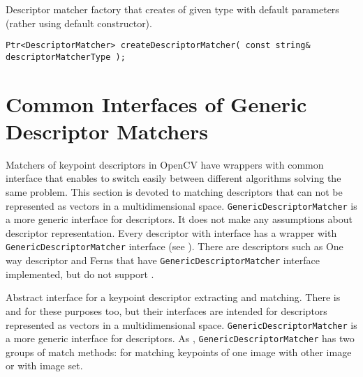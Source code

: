 Descriptor matcher factory that creates  of 
given type with default parameters (rather using default constructor).

\begin{lstlisting}
Ptr<DescriptorMatcher> createDescriptorMatcher( const string& descriptorMatcherType );
\end{lstlisting}

\begin{description}
\end{description}

\section{Common Interfaces of Generic Descriptor Matchers}
Matchers of keypoint descriptors in OpenCV have wrappers with common interface that enables to switch easily 
between different algorithms solving the same problem. This section is devoted to matching descriptors 
that can not be represented as vectors in a multidimensional space. \texttt{GenericDescriptorMatcher} 
is a more generic interface for descriptors. It does not make any assumptions about descriptor representation. 
Every descriptor with  interface has a wrapper with 
\texttt{GenericDescriptorMatcher} interface (see ). 
There are descriptors such as One way descriptor and Ferns that have \texttt{GenericDescriptorMatcher} 
interface implemented, but do not support .

Abstract interface for a keypoint descriptor extracting and matching. 
There is  and  
for these purposes too, but their interfaces are intended for descriptors 
represented as vectors in a multidimensional space. \texttt{GenericDescriptorMatcher} 
is a more generic interface for descriptors.
As , \texttt{GenericDescriptorMatcher} has two groups 
of match methods: for matching keypoints of one image with other image or
with image set.
 
